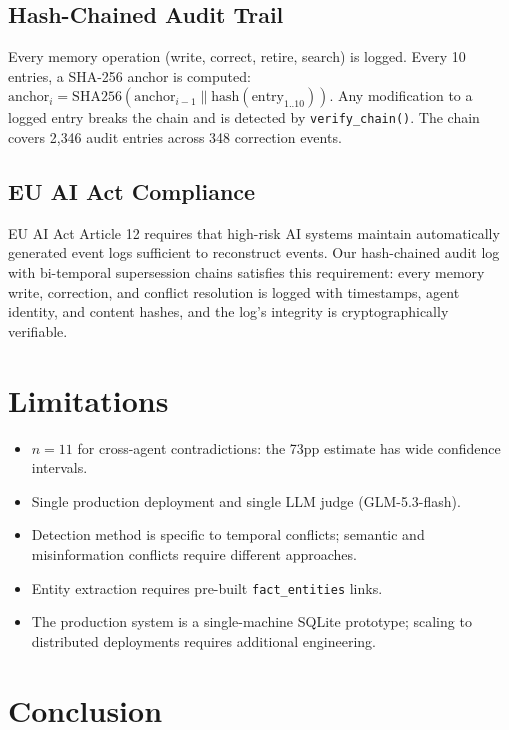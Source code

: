 \documentclass[sigconf]{acmart}
\begin{document}
\subsection{Hash-Chained Audit Trail}

Every memory operation (write, correct, retire, search) is logged. Every 10 entries, a SHA-256 anchor is computed: $\text{anchor}_i = \text{SHA256}(\text{anchor}_{i-1} \| \text{hash}(\text{entry}_{1..10}))$. Any modification to a logged entry breaks the chain and is detected by \texttt{verify\_chain()}. The chain covers 2{,}346 audit entries across 348 correction events.

\subsection{EU AI Act Compliance}

EU AI Act Article 12 requires that high-risk AI systems maintain automatically generated event logs sufficient to reconstruct events. Our hash-chained audit log with bi-temporal supersession chains satisfies this requirement: every memory write, correction, and conflict resolution is logged with timestamps, agent identity, and content hashes, and the log's integrity is cryptographically verifiable.

\section{Limitations}

\begin{itemize}
\item $n{=}11$ for cross-agent contradictions: the 73pp estimate has wide confidence intervals.
\item Single production deployment and single LLM judge (GLM-5.3-flash).
\item Detection method is specific to temporal conflicts; semantic and misinformation conflicts require different approaches.
\item Entity extraction requires pre-built \texttt{fact\_entities} links.
\item The production system is a single-machine SQLite prototype; scaling to distributed deployments requires additional engineering.
\end{itemize}

\section{Conclusion}
\end{document}
